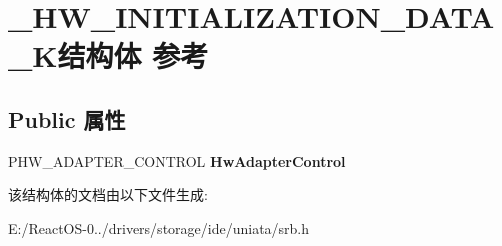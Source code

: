 \hypertarget{struct___h_w___i_n_i_t_i_a_l_i_z_a_t_i_o_n___d_a_t_a__2_k}{}\section{\+\_\+\+H\+W\+\_\+\+I\+N\+I\+T\+I\+A\+L\+I\+Z\+A\+T\+I\+O\+N\+\_\+\+D\+A\+T\+A\+\_\+K结构体 参考}
\label{struct___h_w___i_n_i_t_i_a_l_i_z_a_t_i_o_n___d_a_t_a__2_k}
\subsection*{Public 属性}
\begin{DoxyCompactItemize}
\item 
\mbox{\label{struct___h_w___i_n_i_t_i_a_l_i_z_a_t_i_o_n___d_a_t_a__2_k_aa2253c276726073ccf08622289bfb733}} 
P\+H\+W\+\_\+\+A\+D\+A\+P\+T\+E\+R\+\_\+\+C\+O\+N\+T\+R\+OL {\bfseries Hw\+Adapter\+Control}
\end{DoxyCompactItemize}


该结构体的文档由以下文件生成\+:\begin{DoxyCompactItemize}
\item 
E\+:/\+React\+O\+S-\/0../drivers/storage/ide/uniata/srb.\+h\end{DoxyCompactItemize}
